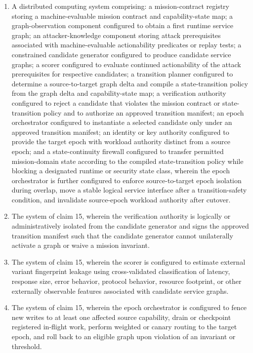 \documentclass[11pt,letterpaper]{article}
\begin{document}
\begin{enumerate}[leftmargin=2em,itemsep=3pt,label=\arabic*.]
\item A distributed computing system comprising: a mission-contract registry storing a machine-evaluable mission contract and capability-state map; a graph-observation component configured to obtain a first runtime service graph; an attacker-knowledge component storing attack prerequisites associated with machine-evaluable actionability predicates or replay tests; a constrained candidate generator configured to produce candidate service graphs; a scorer configured to evaluate continued actionability of the attack prerequisites for respective candidates; a transition planner configured to determine a source-to-target graph delta and compile a state-transition policy from the graph delta and capability-state map; a verification authority configured to reject a candidate that violates the mission contract or state-transition policy and to authorize an approved transition manifest; an epoch orchestrator configured to instantiate a selected candidate only under an approved transition manifest; an identity or key authority configured to provide the target epoch with workload authority distinct from a source epoch; and a state-continuity firewall configured to transfer permitted mission-domain state according to the compiled state-transition policy while blocking a designated runtime or security state class, wherein the epoch orchestrator is further configured to enforce source-to-target epoch isolation during overlap, move a stable logical service interface after a transition-safety condition, and invalidate source-epoch workload authority after cutover.
\item The system of claim 15, wherein the verification authority is logically or administratively isolated from the candidate generator and signs the approved transition manifest such that the candidate generator cannot unilaterally activate a graph or waive a mission invariant.
\item The system of claim 15, wherein the scorer is configured to estimate external variant fingerprint leakage using cross-validated classification of latency, response size, error behavior, protocol behavior, resource footprint, or other externally observable features associated with candidate service graphs.
\item The system of claim 15, wherein the epoch orchestrator is configured to fence new writes to at least one affected source capability, drain or checkpoint registered in-flight work, perform weighted or canary routing to the target epoch, and roll back to an eligible graph upon violation of an invariant or threshold.

\end{enumerate}
\end{document}
